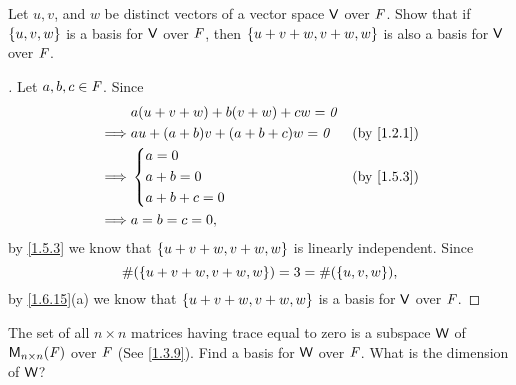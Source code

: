 \begin{ex}\label{ex:1.6.12}
  Let \(u, v\), and \(w\) be distinct vectors of a vector space \(\mathsf{V}\) over \(\mathit{F}\).
  Show that if \(\left\lbrace u, v, w\right\rbrace\) is a basis for \(\mathsf{V}\) over \(\mathit{F}\), then \(\left\lbrace u + v + w, v + w, w\right\rbrace\) is also a basis for \(\mathsf{V}\) over \(\mathit{F}\).
\end{ex}

\begin{proof}[]
  Let \(a, b, c \in \mathit{F}\).
  Since
  \begin{align*}
             & a(u + v + w) + b(v + w) + cw = \zv                 \\
    \implies & au + (a + b)v + (a + b + c)w = \zv &  & \by{1.2.1} \\
    \implies & \begin{dcases}
                 a = 0     \\
                 a + b = 0 \\
                 a + b + c = 0
               \end{dcases}                     &  & \by{1.5.3}   \\
    \implies & a = b = c = 0,
  \end{align*}
  by \cref{1.5.3} we know that \(\left\lbrace u + v + w, v + w, w\right\rbrace\) is linearly independent.
  Since
  \[
    \#(\left\lbrace u + v + w, v + w, w\right\rbrace) = 3 = \#(\left\lbrace u, v, w\right\rbrace),
  \]
  by \cref{1.6.15}(a) we know that \(\left\lbrace u + v + w, v + w, w\right\rbrace\) is a basis for \(\mathsf{V}\) over \(\mathit{F}\).
\end{proof}

\setcounter{ex}{14}
\begin{ex}\label{ex:1.6.15}
  The set of all \(n \times n\) matrices having trace equal to zero is a subspace \(\mathsf{W}\) of \(\ms[n][n][\F]\) over \(\mathit{F}\) (See \cref{1.3.9}).
  Find a basis for \(\mathsf{W}\) over \(\mathit{F}\).
  What is the dimension of \(\mathsf{W}\)?
\end{ex}

